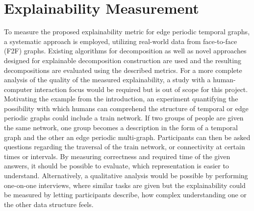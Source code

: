 \section{Explainability Measurement}

To measure the proposed explainability metric for edge periodic temporal graphs, a systematic approach is employed, utilizing real-world data from face-to-face (F2F) graphs.
Existing algorithms for \DFA decomposition as well as novel approaches designed for explainable decomposition construction are used and the resulting decompositions are evaluated using the described metrics.
For a more complete analysis of the quality of the measured explainability, a study with a human-computer interaction focus would be required but is out of scope for this project.
Motivating the example from the introduction, an experiment quantifying the possibility with which humans can comprehend the structure of temporal or edge periodic graphs could include a train network. 
If two groups of people are given the same network, one group becomes a description in the form of a temporal graph and the other an edge periodic multi-graph.
Participants can then be asked questions regarding the traversal of the train network, or connectivity at certain times or intervals.
By measuring correctness and required time of the given answers, it should be possible to evaluate, which representation is easier to understand.  
Alternatively, a qualitative analysis would be possible by performing one-on-one interviews, where similar tasks are given but the explainability could be measured by letting participants describe, how complex understanding one or the other data structure feels.

